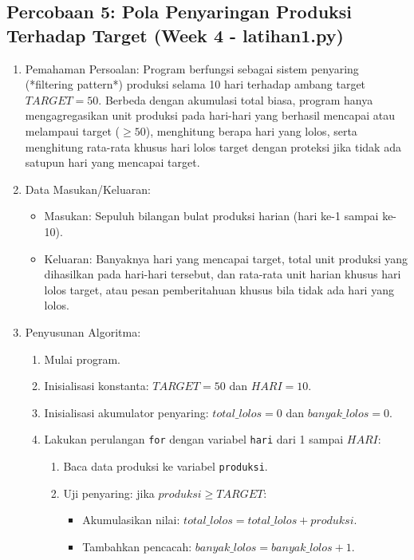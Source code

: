 \documentclass[12pt,a4paper]{article}
\begin{document}
\subsection{Percobaan 5: Pola Penyaringan Produksi Terhadap Target (Week 4 - latihan1.py)}
\begin{enumerate}
    \item Pemahaman Persoalan: Program berfungsi sebagai sistem penyaring (*filtering pattern*) produksi selama 10 hari terhadap ambang target $TARGET = 50$. Berbeda dengan akumulasi total biasa, program hanya mengagregasikan unit produksi pada hari-hari yang berhasil mencapai atau melampaui target ($\ge 50$), menghitung berapa hari yang lolos, serta menghitung rata-rata khusus hari lolos target dengan proteksi jika tidak ada satupun hari yang mencapai target.
    \item Data Masukan/Keluaran:
    \begin{itemize}
        \item Masukan: Sepuluh bilangan bulat produksi harian (hari ke-1 sampai ke-10).
        \item Keluaran: Banyaknya hari yang mencapai target, total unit produksi yang dihasilkan pada hari-hari tersebut, dan rata-rata unit harian khusus hari lolos target, atau pesan pemberitahuan khusus bila tidak ada hari yang lolos.
    \end{itemize}
    \item Penyusunan Algoritma:
    \begin{enumerate}[label=\alph*.]
        \item Mulai program.
        \item Inisialisasi konstanta: $TARGET = 50$ dan $HARI = 10$.
        \item Inisialisasi akumulator penyaring: $total\_lolos = 0$ dan $banyak\_lolos = 0$.
        \item Lakukan perulangan \texttt{for} dengan variabel \texttt{hari} dari 1 sampai $HARI$:
        \begin{enumerate}[label=\roman*.]
            \item Baca data produksi ke variabel \texttt{produksi}.
            \item Uji penyaring: jika $produksi \ge TARGET$:
            \begin{itemize}
                \item Akumulasikan nilai: $total\_lolos = total\_lolos + produksi$.
                \item Tambahkan pencacah: $banyak\_lolos = banyak\_lolos + 1$.

\end{itemize}
\end{enumerate}
\end{enumerate}
\end{enumerate}
\end{document}
